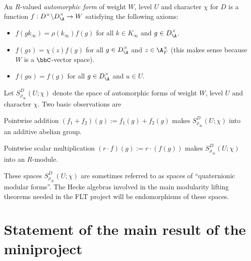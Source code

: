 \begin{definition}
  \label{TotallyDefiniteQuaternionAlgebra.AutomorphicForm}
  \leanok
  An $R$-valued \emph{automorphic form} of weight $W$, level $U$ and character $\chi$ for $D$ is
  a function $f:D^\times\backslash D_{\A}^\times\to W$ satisfying the following axioms:
  \begin{itemize}
    \item $f(gk_\infty)=\rho(k_\infty)f(g)$ for all $k\in K_\infty$ and $g\in D_{\A}^\times$.
    \item $f(gz)=\chi(z)f(g)$ for all $g\in D_{\A}^\times$ and $z\in\A_F^\times$ (this makes
    sense because $W$ is a $\bbC$-vector space).
    \item $f(gu)=f(g)$ for all $g\in D_{\A}^\times$ and $u\in U$.
  \end{itemize}
\end{definition}

Let $S_{\rho_\infty}^D(U;\chi)$ denote the space of automorphic forms of weight $W$, level $U$
and character $\chi$. Two basic observations are

\begin{definition}
  \label{TotallyDefiniteQuaternionAlgebra.AutomorphicForm.addCommGroup}
  \leanok
  Pointwise addition $(f_1+f_2)(g):=f_1(g)+f_2(g)$ makes $S_{\rho_\infty}^D(U;\chi)$ into an
  additive abelian group.
\end{definition}

\begin{definition}
  \label{TotallyDefiniteQuaternionAlgebra.AutomorphicForm.module}
  \leanok
  Pointwise scalar multiplication $(r\cdot f)(g):= r\cdot(f(g))$ makes
  $S_{\rho_\infty}^D(U;\chi)$ into an $R$-module.
\end{definition}

These spaces $S_{\rho_\infty}^D(U;\chi)$ are sometimes referred to as spaces of
``quaternionic modular forms''. The Hecke algebras involved in the main modularity lifting
theorems needed in the FLT project will be endomorphisms of these spaces.

\section{Statement of the main result of the miniproject}


